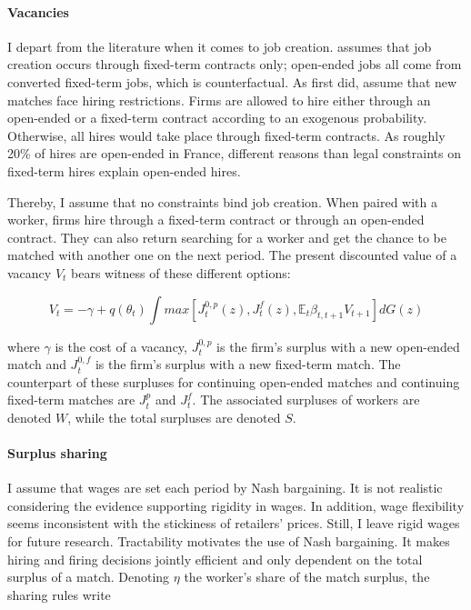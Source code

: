 \paragraph{Vacancies} I depart from the literature when it comes to job creation. \citet{sala2009flexibility} assumes that job creation occurs through fixed-term contracts only; open-ended jobs all come from converted fixed-term jobs, which is counterfactual. As \citet{CAHUC200263} first did, \citet{SJOE:SJOE1715} assume that new matches face hiring restrictions. Firms are allowed to hire either through an open-ended or a fixed-term contract according to an exogenous probability. Otherwise, all hires would take place through fixed-term contracts. As roughly 20\% of hires are open-ended in France, different reasons than legal constraints on fixed-term hires explain open-ended hires.

Thereby, I assume that no constraints bind job creation. When paired with a worker, firms hire through a fixed-term contract or through an open-ended contract. They can also return searching for a worker and get the chance to be matched with another one on the next period. The present discounted value of a vacancy $V_t$ bears witness of these different options:

\begin{equation} \label{eq:def_v}
V_t = - \gamma + q \left( \theta_{t} \right) \int max \left[ J_{t}^{0,p} \left( z \right) , J_{t}^{f} \left( z \right) ,  \mathbb{E}_{t} \beta_{t,t+1} V_{t+1} \right] dG(z)
\end{equation}

where $\gamma$ is the cost of a vacancy, $J_{t}^{0,p}$ is the firm's surplus with a new open-ended match and $J_t^{0,f}$ is the firm's surplus with a new fixed-term match. The counterpart of these surpluses for continuing open-ended matches and continuing fixed-term matches are $J_{t}^{p}$ and $J_t^{f}$. The associated surpluses of workers are denoted $W$, while the total surpluses are denoted $S$. 

\paragraph{Surplus sharing}

I assume that wages are set each period by Nash bargaining. It is not realistic considering the evidence supporting rigidity in wages. In addition, wage flexibility seems inconsistent with the stickiness of retailers' prices. Still, I leave rigid wages for future research. Tractability motivates the use of Nash bargaining. It makes hiring and firing decisions jointly efficient and only dependent on the total surplus of a match. Denoting $\eta$ the worker's share of the match surplus, the sharing rules write

